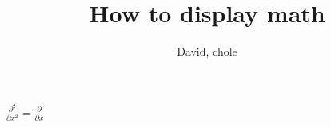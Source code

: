 \documentclass[12pt]{beamer}
\author{David, chole}
\title{How to display math}
\begin{document}
\begin{frame}
\titlepage
\end{frame}


\begin{frame}
$\frac{\partial^2 }{\partial x^2}=\frac{\partial }{\partial x}$
\end{frame}
\end{document}
